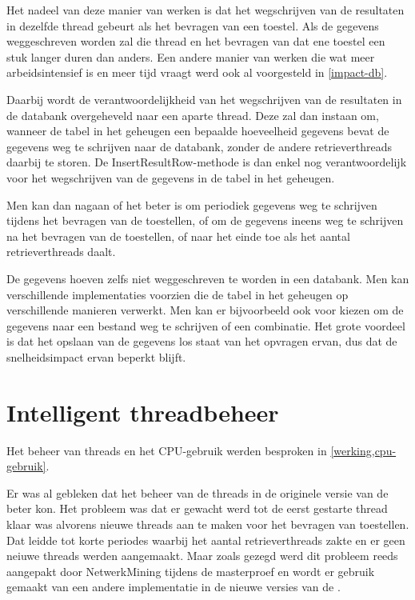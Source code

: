 Het nadeel van deze manier van werken is dat het wegschrijven van de resultaten in dezelfde thread gebeurt als het bevragen van een toestel.
Als de gegevens weggeschreven worden zal die thread en het bevragen van dat ene toestel een stuk langer duren dan anders.
Een andere manier van werken die wat meer arbeidsintensief is en meer tijd vraagt werd ook al voorgesteld in \cref{impact-db}.

Daarbij wordt de verantwoordelijkheid van het wegschrijven van de resultaten in de databank overgeheveld naar een aparte thread.
Deze zal dan instaan om, wanneer de tabel in het geheugen een bepaalde hoeveelheid gegevens bevat de gegevens weg te schrijven naar de databank,
zonder de andere retrieverthreads daarbij te storen.
De InsertResultRow-methode is dan enkel nog verantwoordelijk voor het wegschrijven van de gegevens in de tabel in het geheugen.

Men kan dan nagaan of het beter is om periodiek gegevens weg te schrijven tijdens het bevragen van de toestellen,
of om de gegevens ineens weg te schrijven na het bevragen van de toestellen, of naar het einde toe als het aantal retrieverthreads daalt.

De gegevens hoeven zelfs niet weggeschreven te worden in een databank.
Men kan verschillende implementaties voorzien die de tabel in het geheugen op verschillende manieren verwerkt.
Men kan er bijvoorbeeld ook voor kiezen om de gegevens naar een bestand weg te schrijven of een combinatie.
Het grote voordeel is dat het opslaan van de gegevens los staat van het opvragen ervan, dus dat de snelheidsimpact ervan beperkt blijft.


\section{Intelligent threadbeheer}

Het beheer van threads en het CPU-gebruik werden besproken in \cref{werking,cpu-gebruik}.

Er was al gebleken dat het beheer van de threads in de originele versie van de \nwmretriever{} beter kon.
Het probleem was dat er gewacht werd tot de eerst gestarte thread klaar was alvorens nieuwe threads aan te maken voor het bevragen van toestellen.
Dat leidde tot korte periodes waarbij het aantal retrieverthreads zakte en er geen neiuwe threads werden aangemaakt.
Maar zoals gezegd werd dit probleem reeds aangepakt door NetwerkMining tijdens de masterproef en
wordt er gebruik gemaakt van een andere implementatie in de nieuwe versies van de \nwmretriever{}.

